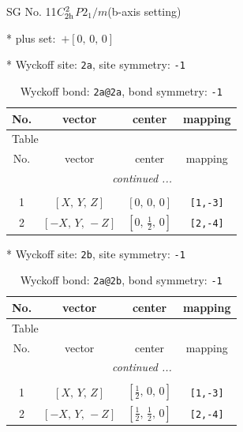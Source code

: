 \documentclass[fleqn,8pt]{jsarticle}
\begin{document}
\setcounter{MaxMatrixCols}{32}

\renewcommand{\tablename}{Table~}
\renewcommand{\figurename}{Figure~}
\begin{center}
\LARGE
SG No. 11\quad$C_{\rm 2h}^{2}$\quad$P2_1/m$\quad(b-axis setting)\quad[ monoclinic ]
\end{center}

* plus set:\,\,\,$+\left[ 0,\, 0,\, 0 \right]$


* Wyckoff site: {\tt 2a}, site symmetry: {\tt -1}
\renewcommand{\arraystretch}{1.2}
\begin{longtable}{cccc}
\caption{Wyckoff bond: {\tt 2a@2a}, bond symmetry: {\tt -1}}
 \\
 \hline \hline
No. & vector & center & mapping \\ \hline \endfirsthead

\multicolumn{3}{l}{\tablename\ \thetable{}} \\
 \hline \hline
No. & vector & center & mapping \\ \hline \endhead

 \hline \hline
\multicolumn{3}{r}{\footnotesize\it continued ...} \\ \endfoot

 \hline \hline
\multicolumn{3}{r}{} \\ \endlastfoot

1 & $\left[ X,\, Y,\, Z \right]$ & $\left[ 0,\, 0,\, 0 \right]$ & {\tt [1,-3]} \\ \hline
2 & $\left[ - X,\, Y,\, - Z \right]$ & $\left[ 0,\, \frac{1}{2},\, 0 \right]$ & {\tt [2,-4]} \\
\end{longtable}
* Wyckoff site: {\tt 2b}, site symmetry: {\tt -1}
\renewcommand{\arraystretch}{1.2}
\begin{longtable}{cccc}
\caption{Wyckoff bond: {\tt 2a@2b}, bond symmetry: {\tt -1}}
 \\
 \hline \hline
No. & vector & center & mapping \\ \hline \endfirsthead

\multicolumn{3}{l}{\tablename\ \thetable{}} \\
 \hline \hline
No. & vector & center & mapping \\ \hline \endhead

 \hline \hline
\multicolumn{3}{r}{\footnotesize\it continued ...} \\ \endfoot

 \hline \hline
\multicolumn{3}{r}{} \\ \endlastfoot

1 & $\left[ X,\, Y,\, Z \right]$ & $\left[ \frac{1}{2},\, 0,\, 0 \right]$ & {\tt [1,-3]} \\ \hline
2 & $\left[ - X,\, Y,\, - Z \right]$ & $\left[ \frac{1}{2},\, \frac{1}{2},\, 0 \right]$ & {\tt [2,-4]} \\
\end{longtable}
\end{document}
